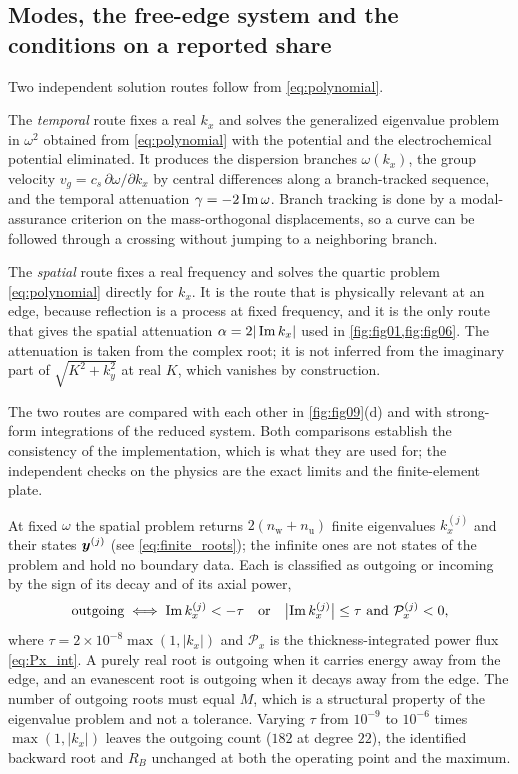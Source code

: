 \subsection{Modes, the free-edge system and the conditions on a reported share}
\label{sec:numerics_routes}
\label{sec:numerics_edge}
\label{sec:numerics_admissibility}

Two independent solution routes follow from \eqref{eq:polynomial}.

The \emph{temporal} route fixes a real $k_x$ and solves the generalized
eigenvalue problem in $\omega^2$ obtained from \eqref{eq:polynomial} with the
potential and the electrochemical potential eliminated.  It produces the
dispersion branches $\omega(k_x)$, the group velocity
$v_g=c_s\,\partial\omega/\partial k_x$ by central differences along a
branch-tracked sequence, and the temporal attenuation
$\gamma=-2\operatorname{Im}\omega$.  Branch tracking is done by a modal-assurance
criterion on the mass-orthogonal displacements, so a curve can be followed
through a crossing without jumping to a neighboring branch.

The \emph{spatial} route fixes a real frequency and solves the quartic problem
\eqref{eq:polynomial} directly for $k_x$.  It is the route that is physically
relevant at an edge, because reflection is a process at fixed frequency, and it
is the only route that gives the spatial attenuation
$\alpha=2|\operatorname{Im} k_x|$ used in \cref{fig:fig01,fig:fig06}.  The attenuation is
taken from the complex root; it is not inferred from the imaginary part of
$\sqrt{K^2+k_y^2}$ at real $K$, which vanishes by construction.

The two routes are compared with each other in \cref{fig:fig09}(d) and with
strong-form integrations of the reduced system.  Both comparisons establish the consistency of
the implementation, which is what they are used for; the independent checks on
the physics are the exact limits and the finite-element plate.


At fixed $\omega$ the spatial problem returns $2(n_{\mathrm{w}}+n_{\mathrm u})$
finite eigenvalues $k_x^{(j)}$ and their states $\boldsymbol{y}^{(j)}$
(see \eqref{eq:finite_roots}); the infinite ones are not states of the problem and
hold no boundary data.  Each is classified as outgoing or incoming by the sign
of its decay and of its axial power,
\begin{equation}
\label{eq:classification}
\text{outgoing}\iff
\operatorname{Im} k_x^{(j)}<-\tau
\quad\text{or}\quad
\bigl|\operatorname{Im} k_x^{(j)}\bigr|\le\tau\ \text{and}\ \mathcal{P}_x^{(j)}<0 ,
\end{equation}
where $\tau=2\times10^{-8}\max(1,|k_x|)$ and $\mathcal{P}_x$ is the
thickness-integrated power flux \eqref{eq:Px_int}.  A purely real root is outgoing when it carries energy away from the edge, and an
evanescent root is outgoing when it decays away from the edge.  The number of
outgoing roots must equal $M$, which is a structural property of the
eigenvalue problem and not a tolerance.  Varying $\tau$ from $10^{-9}$ to $10^{-6}$ times $\max(1,|k_x|)$ leaves the outgoing count ($182$ at degree $22$), the identified backward root and $R_B$ unchanged at both the operating point and the maximum.

